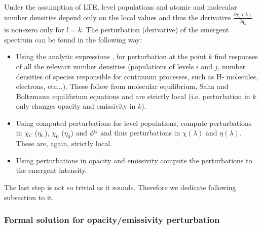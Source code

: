 \documentclass[referee]{aa}
\begin{document}
Under the assumption of LTE, level populations and atomic and molecular number densities depend only on the local values and thus the derivative $\frac{\partial \chi_l(\lambda)}{\partial q_k}$ is non-zero only for $l=k$. The perturbation (derivative) of the emergent spectrum can be found in the following way:
\begin{itemize}
 \item Using the analytic expressions \citep{SIR, dtibook}, for perturbation at the point $k$ find responses of all the relevant number densities (populations of levels $i$ and $j$, number densities of species responsible for continuum processes, such as H- molecules, electrons, etc...). These follow from molecular equilibrium, Saha and Boltzmann equilibrium equations and are strictly local (i.e. perturbation in $k$ only changes opacity and emissivity in $k$).
 \item Using computed perturbations for level populations, compute perturbations in $\chi_{\rm c}$ ($\eta_{\rm c}$), $\chi_0$ ($\eta_0$) and $\phi^{ij}$ and thus perturbations in $\chi(\lambda)$ and $\eta(\lambda)$. These are, again, strictly local.
 \item Using perturbations in opacity and emissivity compute the perturbations to the emergent intensity.
\end{itemize}
The last step is not so trivial as it sounds. Therefore we dedicate following subsection to it. 

\subsubsection{Formal solution for opacity/emissivity perturbation}
\end{document}
